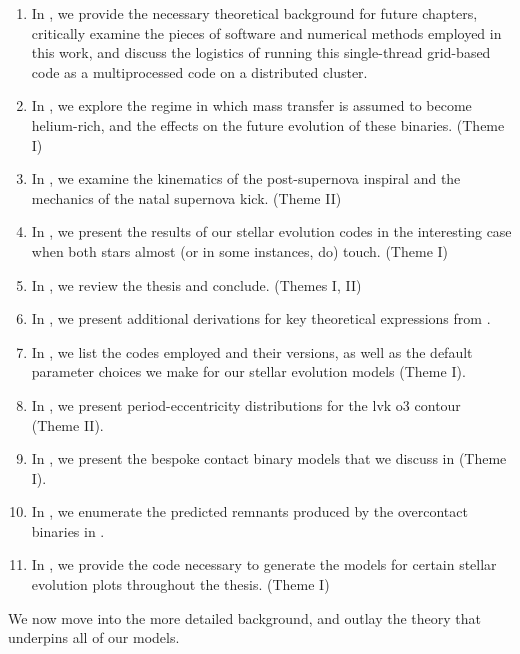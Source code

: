 \begin{enumerate}
    \item In , we provide the necessary theoretical background for future chapters, critically examine the pieces of software and numerical methods employed in this work, and discuss the logistics of running this single-thread grid-based code as a multiprocessed code on a distributed cluster.
    \item In , we explore the regime in which mass transfer is assumed to become helium-rich, and the effects on the future evolution of these binaries. (Theme I)
    \item In , we examine the kinematics of the post-supernova inspiral and the mechanics of the natal supernova kick. (Theme II)
    \item In , we present the results of our stellar evolution codes in the interesting case when both stars almost (or in some instances, do) touch. (Theme I)
    \item In , we review the thesis and conclude. (Themes I, II)
    \item In , we present additional derivations for key theoretical expressions from .
    \item In , we list the codes employed and their versions, as well as the default parameter choices we make for our stellar evolution models (Theme I).
    \item In , we present period-eccentricity distributions for the \acrshort{lvk} \acrshort{o3} contour (Theme II).
    \item In , we present the bespoke contact binary models that we discuss in  (Theme I).
    \item In , we enumerate the predicted remnants produced by the overcontact binaries in .
    \item In , we provide the  code necessary to generate the models for certain stellar evolution plots throughout the thesis. (Theme I)
\end{enumerate}

We now move into the more detailed background, and outlay the theory that underpins all of our models.